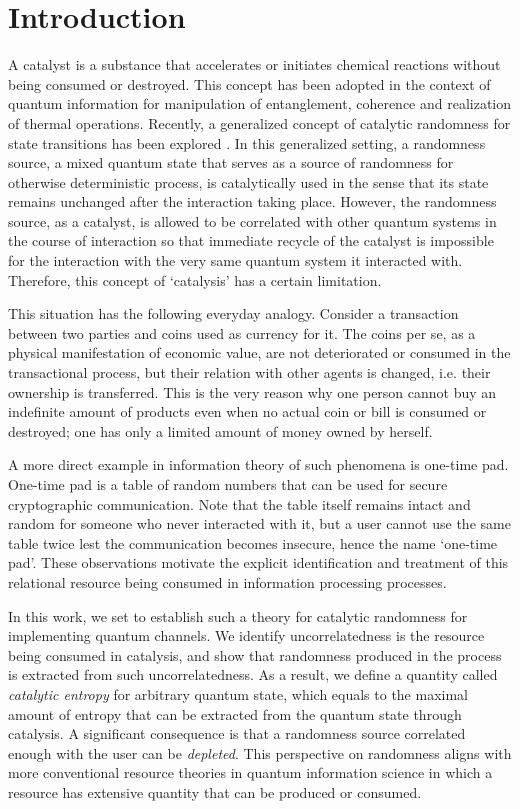 \documentclass[aps, reprint, amsmath,amssymb, prx, superscriptaddress]{revtex4-2}
\begin{document}
\section{Introduction}
A catalyst is a substance that accelerates or initiates chemical reactions without being consumed or destroyed. This concept has been adopted in the context of quantum information for manipulation of entanglement, coherence and realization of thermal operations. Recently, a generalized concept of catalytic randomness for state transitions has been explored \cite{boes2018catalytic, boes2019neumann, lie2019unconditionally, lie2020minent, lie2020randomness, muller2018correlating}. In this generalized setting, a randomness source, a mixed quantum state that serves as a source of randomness for otherwise deterministic process, is catalytically used in the sense that its state remains unchanged after the interaction taking place. However, the randomness source, as a catalyst, is allowed to be correlated with other quantum systems in the course of interaction so that immediate recycle of the catalyst is impossible for the interaction with the very same quantum system it interacted with. Therefore, this concept of `catalysis' has a certain limitation.

This situation has the following everyday analogy. Consider a transaction between two parties and coins used as currency for it. The coins per se, as a physical manifestation of economic value, are not deteriorated or consumed in the transactional process, but their relation with other agents is changed, i.e. their ownership is transferred. This is the very reason why one person cannot buy an indefinite amount of products even when no actual coin or bill is consumed or destroyed; one has only a limited amount of money owned by herself.

A more direct example in information theory of such phenomena is one-time pad. One-time pad is a table of random numbers that can be used for secure cryptographic communication. Note that the table itself remains  intact and random for someone who never interacted with it, but a user cannot use the same table twice lest the communication becomes insecure, hence the name `one-time pad'. These observations motivate the explicit identification and treatment of this relational resource being consumed in information processing processes. 



In this work, we set to establish such a theory for catalytic randomness for implementing quantum channels. We identify uncorrelatedness is the resource being consumed in catalysis, and show that randomness produced in the process is extracted from such uncorrelatedness. As a result, we define a quantity called \textit{catalytic entropy} for arbitrary quantum state, which equals to the maximal amount of entropy that can be extracted from the quantum state through catalysis. A significant consequence is that a randomness source correlated enough with the user can be \textit{depleted}. This perspective on randomness aligns with more conventional resource theories in quantum information science in which a resource has extensive quantity that can be produced or consumed.
\end{document}
